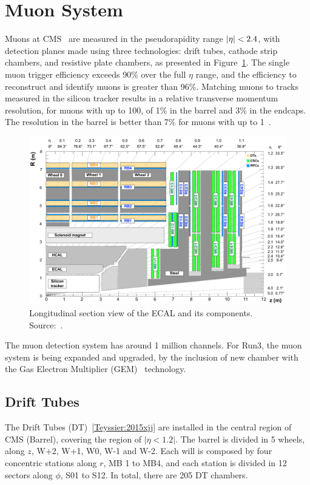 
\section{Muon System}

Muons at CMS~\cite{muon_tdr} are measured in the pseudorapidity range $\lvert \eta \rvert < 2.4$, with detection planes made using three technologies: drift tubes, cathode strip chambers, and resistive plate chambers, as presented in Figure~\ref{cms_muon}. The single muon trigger efficiency exceeds 90\% over the full $\eta$ range, and the efficiency to reconstruct and identify muons is greater than 96\%. Matching muons to tracks measured in the silicon tracker results in a relative transverse momentum resolution, for muons with \pt up to 100\GeV, of 1\% in the barrel and 3\% in the endcaps. The \pt resolution in the barrel is better than 7\% for muons with \pt up to 1\TeV~\cite{Sirunyan:2018}. 

\begin{figure}[htbp]
    \centering
    \includegraphics[width=\textwidth]{figures_and_tables/experimental_setup/cms_muon.pdf}
    \caption{Longitudinal section view of the ECAL and its components. Source:~\cite{Chatrchyan:2013sba}.}
    \label{cms_muon}
\end{figure}

The muon detection system has around 1 million channels. For Run3, the muon system is being expanded and upgraded, by the inclusion of new chamber with the Gas Electron Multiplier (GEM)~\cite{Sauli:2262884} technology.

\subsection{Drift Tubes}

The Drift Tubes (DT)~\ref{Teyssier:2015xjj} are installed in the central region of CMS (Barrel), covering the region of $|\eta < 1.2|$. The barrel is divided in 5 wheels, along $z$, W+2, W+1, W0, W-1 and W-2. Each will is composed by four concentric stations along $r$, MB 1 to MB4, and each station is divided in 12 sectors along $\phi$, S01 to S12. In total, there are 205 DT chambers.

